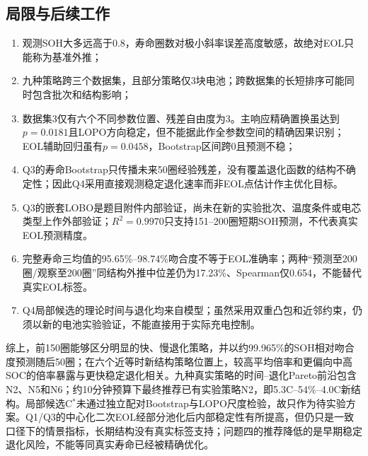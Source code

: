 \documentclass[withoutpreface]{cumcmthesis}
\begin{document}
\subsection{局限与后续工作}

\begin{enumerate}[label=\arabic*)]
  \item 观测SOH大多远高于0.8，寿命圈数对极小斜率误差高度敏感，故绝对EOL只能称为基准外推；
  \item 九种策略跨三个数据集，且部分策略仅3块电池；跨数据集的长短排序可能同时包含批次和结构影响；
  \item 数据集3仅有六个不同参数位置、残差自由度为3。主响应精确置换虽达到$p=0.0181$且LOPO方向稳定，但不能据此作全参数空间的精确因果识别；EOL辅助回归虽有$p=0.0458$，Bootstrap区间跨0且预测不稳；
  \item Q3的寿命Bootstrap只传播未来50圈经验残差，没有覆盖退化函数的结构不确定性；因此Q4采用直接观测稳定退化速率而非EOL点估计作主优化目标。
  \item Q3的嵌套LOBO是题目附件内部验证，尚未在新的实验批次、温度条件或电芯类型上作外部验证；$R^2=0.9970$只支持151--200圈短期SOH预测，不代表真实EOL预测精度。
  \item 完整寿命三均值的95.65\%--98.74\%吻合度不等于EOL准确率；两种“预测至200圈/观察至200圈”同结构外推中位差仍为17.23\%、Spearman仅0.654，不能替代真实EOL标签。
  \item Q4局部候选的理论时间与退化均来自模型；虽然采用双重凸包和近邻约束，仍须以新的电池实验验证，不能直接用于实际充电控制。
\end{enumerate}

综上，前150圈能够区分明显的快、慢退化策略，并以约99.965\%的SOH相对吻合度预测随后50圈；在六个近等时新结构策略位置上，较高平均倍率和更偏向中高SOC的倍率暴露与更快稳定退化相关。九种真实策略的时间--退化Pareto前沿包含N2、N5和N6；约10分钟预算下最终推荐已有实验策略N2，即5.3C--54\%--4.0C新结构。局部候选C$^*$未通过独立配对Bootstrap与LOPO尺度检验，故只作为待实验方案。Q1/Q3的中心化二次EOL经部分池化后内部稳定性有所提高，但仍只是一致口径下的情景指标，长期结构没有真实标签支持；问题四的推荐降低的是早期稳定退化风险，不能等同真实寿命已经被精确优化。
\end{document}
